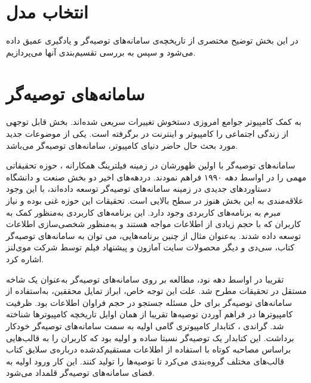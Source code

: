 \section*{انتخاب مدل}

در این بخش توضیح مختصری از تاریخچه‌ی سامانه‌های توصیه‌گر و یادگیری عمیق داده می‌شود و سپس به بررسی تقسیم‌بندی آنها می‌پردازیم.

\section{سامانه‌های توصیه‌گر}

به کمک کامپیوتر‌ جوامع امروزی دستخوش تغییرات سریعی شده‌اند. بخش قابل توجهی از زندگی اجتماعی را کامپیوتر و اینترنت در برگرفته ‌است. یکی از موضوعات جدید مورد بحث حال حاضر دنیای کامپیوتر، سامانه‌های توصیه‌گر می‌باشد.

سامانه‌های توصیه‌گر
با اولین ظهورشان در زمینه فیلترینگ همکارانه
،
حوزه تحقیقاتی مهمی را در اواسط دهه ۱۹۹۰ فراهم نمودند. دردهه‌های اخیر دو بخش صنعت و دانشگاه دستاوردهای جدیدی در زمینه سامانه‌های توصیه‌گر توسعه داده‌اند، با این ‌وجود علاقه‌مندی به این بخش هنوز در سطح بالایی است. تحقیقات این حوزه غنی بوده و نیاز مبرم به برنامه‌های کاربردی وجود دارد. این برنامه‌های کاربردی به‌منظور کمک به کاربران که با حجم زیادی از اطلاعات مواجه هستند و به‌منظور شخصی‌سازی اطلاعات توسعه داده شدند. به‌عنوان مثال از چنین برنامه‌هایی، می توان به سامانه‌های توصیه‌گر کتاب، سی‌دی و دیگر محصولات سایت آمازون
و پیشنهاد فیلم توسط شرکت موی‌لنز
اشاره کرد.

تقریبا در اواسط دهه نود، مطالعه بر روی سامانه‌های توصیه‌گر به‌عنوان یک شاخه مستقل در تحقیقات مطرح شد. علت این توجه خاص، ابراز تمایل محققین، به‌استفاده از سامانه‌های توصیه‌گر برای حل مسئله جستجو در حجم فراوان اطلاعات بود. ظرفیت کامپیوترها در فراهم آوردن توصیه‌ها تقریبا از همان اوایل تاریخچه کامپیوتر‌ها شناخته شد. گراندی
،
کتابدار کامپیوتری گامی اولیه به سمت سامانه‌های توصیه‌گر خودکار برداشت. این کتابدار یک توصیه‌گر نسبتا ساده و اولیه بود که کاربران را به قالب‌هایی براساس مصاحبه کوتاه با استفاده از اطلاعات مستقیم‌کدشده
درباره‌ی سلایق کتاب قالب‌های مختلف گروه‌بندی می‌کرد تا توصیه‌ها را تولید کنند. این کار ورود اولیه به فضای سامانه‌های توصیه‌گر قلمداد می‌شود.

